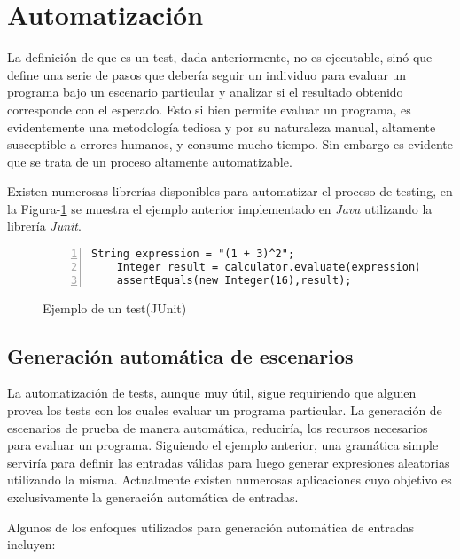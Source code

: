 \section{Automatizaci\'on}
\label{sec:preliminares.testing.automation}

La definici\'on de que es un test, dada anteriormente, no es ejecutable, sin\'o que define una serie de pasos que deber\'ia seguir un individuo para evaluar un programa bajo un escenario particular y analizar si el resultado obtenido corresponde con el esperado. Esto si bien permite evaluar un programa, es evidentemente una metodolog\'ia tediosa y por su naturaleza manual, altamente susceptible a errores humanos, y consume mucho tiempo. Sin embargo es evidente que se trata de un proceso altamente automatizable.

Existen numerosas librer\'ias disponibles para automatizar el proceso de testing, en la Figura-\ref{figures.examples.test.junit} se muestra el ejemplo anterior implementado en \emph{Java} utilizando la librer\'ia \emph{Junit}.

\begin{figure}
	\begin{lstlisting}[frame=single, mathescape=true,numbers=left,framexleftmargin=1.5em]
	String expression = "(1 + 3)^2";
	Integer result = calculator.evaluate(expression);
	assertEquals(new Integer(16),result);
	\end{lstlisting}
	\caption{Ejemplo de un test(JUnit)}
	\label{figures.examples.test.junit}
\end{figure}

\subsection{Generaci\'on autom\'atica de escenarios}

La automatizaci\'on de tests, aunque muy \'util, sigue requiriendo que alguien provea los tests con los cuales evaluar un programa particular. La generaci\'on de escenarios de prueba de manera autom\'atica, reducir\'ia, los recursos necesarios para evaluar un programa. Siguiendo el ejemplo anterior, una gram\'atica simple servir\'ia para definir las entradas v\'alidas para luego generar expresiones aleatorias utilizando la misma. Actualmente existen numerosas aplicaciones cuyo objetivo es exclusivamente la generaci\'on autom\'atica de entradas.

Algunos de los enfoques utilizados para generaci\'on autom\'atica de entradas incluyen:


